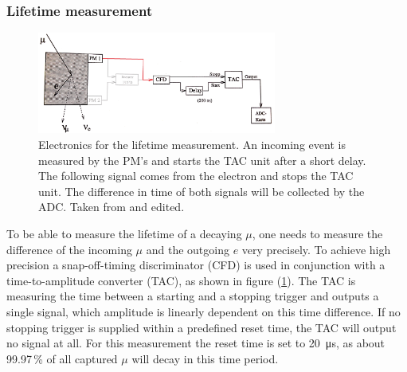\subsubsection{Lifetime measurement}
	
	\begin{figure}[ht]
		\centering
		\includegraphics[width=0.7\textwidth]{img/lebensdauer.jpg}
		\caption{Electronics for the lifetime measurement.
			An incoming event is measured by the PM's and starts the TAC unit after a short delay.
			The following signal comes from the electron and stops the TAC unit.
			The difference in time of both signals will be collected by the ADC.
			Taken from \cite{wwu} and edited.
		}
		\label{fig:electronics_lifetime}
	\end{figure}

	To be able to measure the lifetime of a decaying $\mu$, one needs to measure the difference of the incoming $\mu$ and the outgoing $e$ very precisely.
	To achieve high precision a snap-off-timing discriminator (CFD) is used in conjunction with a time-to-amplitude converter (TAC), as shown in figure (\ref{fig:electronics_lifetime}).
	The TAC is measuring the time between a starting and a stopping trigger and outputs a single signal, which amplitude is linearly dependent on this time difference.
	If no stopping trigger is supplied within a predefined reset time, the TAC will output no signal at all.
	For this measurement the reset time is set to \SI{20}{\micro\second}, as about 99.97\,\% of all captured $\mu$ will decay in this time period.

